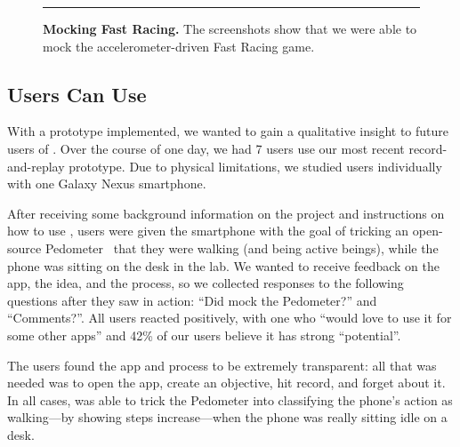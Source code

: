 \begin{figure}[t]
\caption{\textbf{Mocking Fast Racing.} The screenshots show that we were able
to mock the accelerometer-driven Fast Racing game.}

\vspace*{0.1in}
\hrule
\vspace*{-0.15in}

\label{fig-mocking-game}

\end{figure}

\subsection{Users Can Use \PocketMocker{}}
\label{subsec-usability}


With a  prototype implemented, we wanted to gain a qualitative insight to
future users of \PocketMocker{}. Over the course of one day, we had 7 users use
our most recent record-and-replay prototype. Due to physical limitations, we
studied users individually with one Galaxy Nexus smartphone. 

After receiving some background information on the project and instructions
on how to use \PocketMocker{}, users were given the smartphone with the goal
of tricking an open-source Pedometer~\cite{pedometer-playstore-url} that they
were walking (and being active beings), while the phone was sitting on the
desk in the lab. We wanted to receive feedback on the app, the idea,
and the process, so we collected responses to the following questions after
they saw \PocketMocker{} in action: ``Did \PocketMocker{} mock the Pedometer?'' and
``Comments?''. All users reacted positively, with one who ``would love to use
it for some other apps'' and 42\% of our users believe it has strong
``potential''. 

The users found the app and process to be extremely transparent: all
that was needed was to open the app, create an objective, hit record, and
forget about it. In all cases, \PocketMocker{} was able to trick the
Pedometer into classifying the phone's action as walking---by showing steps
increase---when the phone was really sitting idle on a desk.
